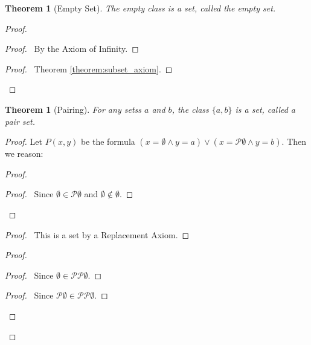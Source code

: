 \documentclass{report}
\let\qed\relax
\newtheorem{theorem}[axiom]{Theorem}
\theoremstyle{definition}
\begin{document}
    \begin{theorem}[Empty Set]
        The empty class is a set, called the \emph{empty set}.
    \end{theorem}

    \begin{proof}
        \pf
        \begin{proof}
            \pf\ By the Axiom of Infinity.
        \end{proof}
        \begin{proof}
            \pf\ Theorem \ref{theorem:subset_axiom}.
        \end{proof}
        \qed
    \end{proof}

    \begin{theorem}[Pairing]
        For any setss $a$ and $b$, the class $\{a,b\}$ is a set, called a \emph{pair set}.
    \end{theorem}

    \begin{proof}
        \pf
        Let $P(x,y)$ be the formula $(x = \emptyset \wedge y = a) \vee (x = \mathcal{P} \emptyset \wedge
        y = b)$. Then we reason:
        \begin{proof}
            \begin{proof}
                \pf\ Since $\emptyset \in \mathcal{P} \emptyset$ and $\emptyset \notin \emptyset$.
            \end{proof}
        \end{proof}
        \begin{proof}
            \pf\ This is a set by a Replacement Axiom.
        \end{proof}
        \begin{proof}
            \begin{proof}
                \pf\ Since $\emptyset \in \mathcal{P} \mathcal{P} \emptyset$.
            \end{proof}
            \begin{proof}
                \pf\ Since $\mathcal{P} \emptyset \in \mathcal{P} \mathcal{P} \emptyset$.
            \end{proof}
        \end{proof}
        \qed
    \end{proof}
\end{document}
